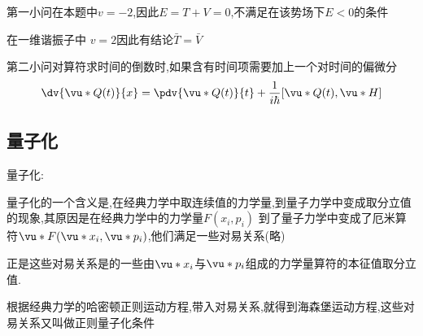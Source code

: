             第一小问在本题中$ v = -2 $,因此$ E = T + V = 0 $,不满足在该势场下$E<0$的条件

            在一维谐振子中 $ v = 2 $因此有结论$ \bar{T} = \bar{V} $

            第二小问对算符求时间的倒数时,如果含有时间项需要加上一个对时间的偏微分
            $$ \dv{\vu*{Q}(t)}{x} = \pdv{\vu*{Q}(t)}{t} + \frac{1}{i \hbar } [\vu*{Q}(t),\vu*{H}]$$

        \subsection{量子化}
            \begin{formal}
                量子化:

                量子化的一个含义是,在经典力学中取连续值的力学量,到量子力学中变成取分立值的现象,其原因是在经典力学中的力学量$F(x_{i},p_{i})$
                到了量子力学中变成了厄米算符$\vu*{F}(\vu*{x}_{i},\vu*{p}_{i})$,他们满足一些对易关系(略)

                正是这些对易关系是的一些由$\vu*{x}_{i}$与$\vu*{p}_{i}$组成的力学量算符的本征值取分立值.

                根据经典力学的哈密顿正则运动方程,带入对易关系,就得到海森堡运动方程,这些对易关系又叫做正则量子化条件

            \end{formal}
    


